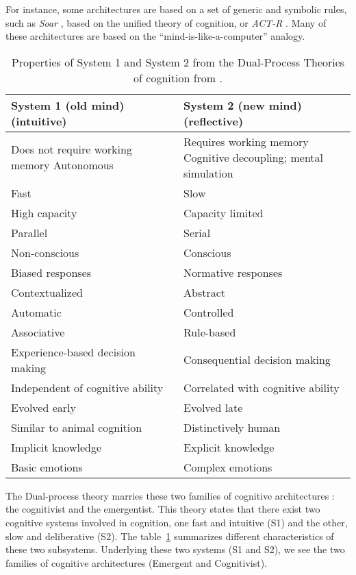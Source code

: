 \documentclass[conference]{IEEEtran}
\begin{document}
For instance, some architectures are based on a set of generic and symbolic rules, such as \textit{Soar} \cite{Laird2012}, based on the unified theory of cognition, or \textit{ACT-R} \cite{Anderson2005}. 
Many of these architectures are based on the ``mind-is-like-a-computer'' analogy.

\begin{table}
	\begin{tabular}{p{0.5\linewidth} p{0.5\linewidth}} \hline
		System 1 (old mind) (intuitive) & System 2 (new mind) (reflective) \\ \hline
		Does not require working memory Autonomous &
		Requires working memory Cognitive decoupling; mental simulation \\
		Fast & Slow \\
		High capacity & Capacity limited \\
		Parallel & Serial \\
		Non-conscious &	Conscious \\
		Biased responses & Normative responses \\
		Contextualized & Abstract \\
		Automatic & Controlled \\
		Associative & Rule-based \\
		Experience-based decision making & Consequential decision making \\
		Independent of cognitive ability & Correlated with cognitive ability \\ \hline
		Evolved early  & Evolved late \\
		Similar to animal cognition &	Distinctively human \\
		Implicit knowledge  & Explicit knowledge \\
		Basic emotions & Complex emotions \\ \hline
	\end{tabular}
	\caption{Properties of System 1 and System 2 from the Dual-Process Theories of cognition from \cite{Evans2013}.}
	\label{fig:dual_system}
\end{table}

The Dual-process theory marries these two families of cognitive architectures \cite{Evans2013}: the cognitivist and the emergentist.
This theory states that there exist two cognitive systems involved in cognition, one fast and intuitive (S1) and the other, slow and deliberative (S2).
The table~\ref{fig:dual_system} summarizes different characteristics of these two subsystems.
Underlying these two systems (S1 and S2), we see the two families of cognitive architectures (Emergent and Cognitivist).
\end{document}
